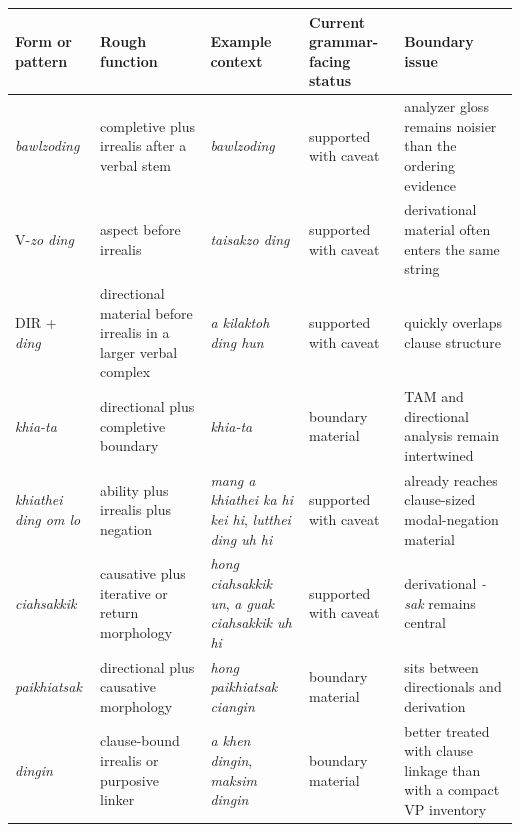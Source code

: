 \documentclass[
  11pt,
  a4paper,
]{article}
\newcounter{none} %
\newcommand{\tdim}[1]{\textit{#1}}
\begin{document}
{\def\LTcaptype{none} %
\begin{longtable}[]{@{}
  >{\raggedright\arraybackslash}p{}
  >{\raggedright\arraybackslash}p{}
  >{\raggedright\arraybackslash}p{}
  >{\raggedright\arraybackslash}p{}
  >{\raggedright\arraybackslash}p{}@{}}
\toprule\noalign{}
\begin{minipage}[b]{\linewidth}\raggedright
Form or pattern
\end{minipage} & \begin{minipage}[b]{\linewidth}\raggedright
Rough function
\end{minipage} & \begin{minipage}[b]{\linewidth}\raggedright
Example context
\end{minipage} & \begin{minipage}[b]{\linewidth}\raggedright
Current grammar-facing status
\end{minipage} & \begin{minipage}[b]{\linewidth}\raggedright
Boundary issue
\end{minipage} \\
\midrule\noalign{}
\endhead
\bottomrule\noalign{}
\endlastfoot
\tdim{bawlzoding} & completive plus irrealis after a verbal stem &
\tdim{bawlzoding} & supported with caveat & analyzer gloss remains
noisier than the ordering evidence \\
V-\tdim{zo ding} & aspect before irrealis & \tdim{taisakzo ding} &
supported with caveat & derivational material often enters the same
string \\
DIR + \tdim{ding} & directional material before irrealis in a larger
verbal complex & \tdim{a kilaktoh ding hun} & supported with caveat &
quickly overlaps clause structure \\
\tdim{khia-ta} & directional plus completive boundary & \tdim{khia-ta} &
boundary material & TAM and directional analysis remain intertwined \\
\tdim{khiathei ding om lo} & ability plus irrealis plus negation &
\tdim{mang a khiathei ka hi kei hi}, \tdim{lutthei ding uh hi} &
supported with caveat & already reaches clause-sized modal-negation
material \\
\tdim{ciahsakkik} & causative plus iterative or return morphology &
\tdim{hong ciahsakkik un}, \tdim{a guak ciahsakkik uh hi} & supported
with caveat & derivational \tdim{-sak} remains central \\
\tdim{paikhiatsak} & directional plus causative morphology &
\tdim{hong paikhiatsak ciangin} & boundary material & sits between
directionals and derivation \\
\tdim{dingin} & clause-bound irrealis or purposive linker &
\tdim{a khen dingin}, \tdim{maksim dingin} & boundary material & better
treated with clause linkage than with a compact VP inventory \\
\end{longtable}
}
\end{document}
